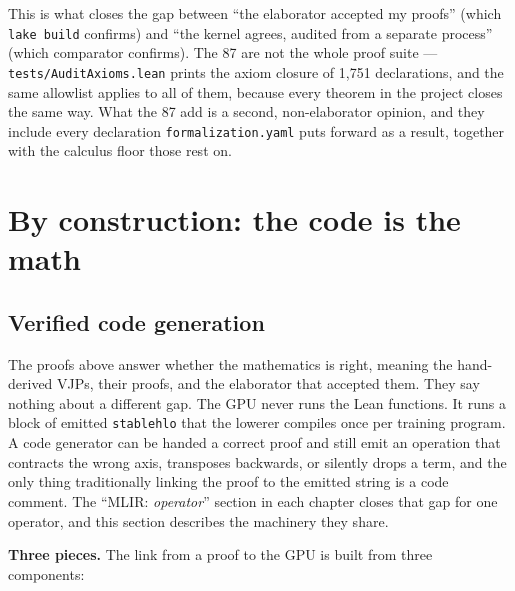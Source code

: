 This is what closes the gap between ``the elaborator accepted my
proofs'' (which \texttt{lake build} confirms) and ``the kernel
agrees, audited from a separate process'' (which comparator confirms).
The 87 are not the whole proof suite --- \texttt{tests/AuditAxioms.lean}
prints the axiom closure of 1{,}751 declarations, and the same allowlist
applies to all of them, because every theorem in the project closes the
same way. What the 87 add is a second, non-elaborator opinion, and they
include every declaration \texttt{formalization.yaml} puts forward as a
result, together with the calculus floor those rest on.

\section{By construction: the code is the math}

\subsection{Verified code generation}
\label{sec:verified_codegen}

The proofs above answer whether the mathematics is right, meaning the
hand-derived VJPs, their proofs, and the elaborator that accepted them. They
say nothing about a different gap. The GPU never runs the Lean functions. It
runs a block of emitted \texttt{stablehlo} that the lowerer compiles once per
training program. A code generator can be handed a correct proof and still
emit an operation that contracts the wrong axis, transposes backwards, or
silently drops a term, and the only thing traditionally linking the proof
to the emitted string is a code comment. The ``MLIR: \emph{operator}''
section in each chapter closes that gap for one operator, and this section
describes the machinery they share.

\medskip\noindent\textbf{Three pieces.} The link from a proof to the GPU is
built from three components:

